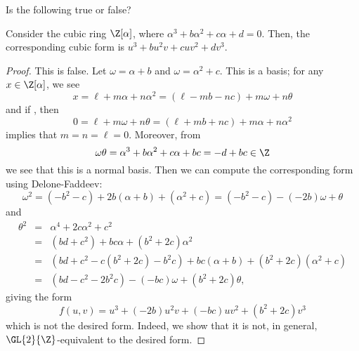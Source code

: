 \documentclass[10pt]{amsart}
\begin{document}
\setcounter{thm}{9}
\begin{thm}
  Is the following true or false?
  
  Consider the cubic ring $\Z[\alpha]$, where $\alpha^3 + b\alpha^2 + c\alpha + d = 0$.
  Then, the corresponding cubic form is $u^3 + bu^2v + cuv^2 + dv^3$.
  
  \begin{proof}
    This is false.
    Let $\omega = \alpha + b$ and $\omega = \alpha^2 + c$.
    This is a basis; for any $x \in \Z[\alpha]$, we see
    $$x = \ell + m\alpha + n\alpha^2 = (\ell - mb - nc) + m\omega + n\theta$$
    and if , then
    $$0 = \ell + m\omega + n\theta = (\ell + mb + nc) + m\alpha + n\alpha^2$$
    implies that $m = n = \ell = 0$.
    Moreover, from
    $$\omega\theta = \alpha^3 + b\alpha^2 + c\alpha + bc = -d + bc \in \Z$$
    we see that this is a normal basis.
    Then we can compute the corresponding form using Delone-Faddeev:
    $$\omega^2 = (-b^2 - c) + 2b(\alpha + b) + (\alpha^2 + c) = (-b^2 - c) - (-2b)\omega + \theta$$
    and
    \begin{eqnarray*}
      \theta^2 &=& \alpha^4 + 2c\alpha^2 + c^2\\
      &=& (bd + c^2) + bc\alpha + (b^2 + 2c)\alpha^2\\
      &=& (bd + c^2 - c(b^2 + 2c) - b^2c) + bc(\alpha + b) + (b^2 + 2c)(\alpha^2 + c)\\
      &=& (bd - c^2 - 2b^2c) - (-bc)\omega + (b^2 + 2c)\theta,
    \end{eqnarray*}
    giving the form
    $$f(u,v) = u^3 + (-2b)u^2v + (-bc)uv^2 + (b^2 + 2c)v^3$$
    which is not the desired form.
    Indeed, we show that it is not, in general, $\GL{2}{\Z}$-equivalent to the desired form.
    

\end{proof}
\end{thm}
\end{document}
